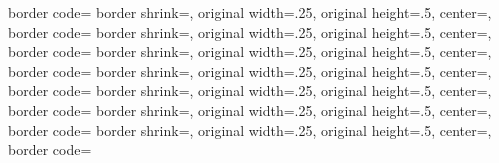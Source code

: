 {{	border code=\pgfsetlinewidth{.5pt}\pgfstroke
  }%
  {%
	border shrink=\pgfpageoptionborder,%
	original width=.25\pgfpageoptionheight,%
	original height=.5\pgfpageoptionwidth,%
	center=\pgfpoint{0pt}{\pgfphysicalheight},%
	border code=\pgfsetlinewidth{.5pt}\pgfstroke
	}%
  {%
	border shrink=\pgfpageoptionborder,%
	original width=.25\pgfpageoptionheight,%
	original height=.5\pgfpageoptionwidth,%
	center=\pgfpoint{.5\pgfphysicalwidth}{.75\pgfphysicalheight},%
	border code=\pgfsetlinewidth{.5pt}\pgfstroke
  }%
  {%
	border shrink=\pgfpageoptionborder,%
	original width=.25\pgfpageoptionheight,%
	original height=.5\pgfpageoptionwidth,%
	center=\pgfpoint{0pt}{.75\pgfphysicalheight},%
	border code=\pgfsetlinewidth{.5pt}\pgfstroke
  }%
  {%
	border shrink=\pgfpageoptionborder,%
	original width=.25\pgfpageoptionheight,%
	original height=.5\pgfpageoptionwidth,%
	center=\pgfpoint{.5\pgfphysicalwidth}{.5\pgfphysicalheight},%
	border code=\pgfsetlinewidth{.5pt}\pgfstroke
  }%
  {%
	border shrink=\pgfpageoptionborder,%
	original width=.25\pgfpageoptionheight,%
	original height=.5\pgfpageoptionwidth,%
	center=\pgfpoint{0pt}{.5\pgfphysicalheight},%
	border code=\pgfsetlinewidth{.5pt}\pgfstroke
  }%
  {%
	border shrink=\pgfpageoptionborder,%
	original width=.25\pgfpageoptionheight,%
	original height=.5\pgfpageoptionwidth,%
	center=\pgfpoint{.5\pgfphysicalwidth}{.25\pgfphysicalheight},%
	border code=\pgfsetlinewidth{.5pt}\pgfstroke
  }%
  {%
	border shrink=\pgfpageoptionborder,%
	original width=.25\pgfpageoptionheight,%
	original height=.5\pgfpageoptionwidth,%
	center=\pgfpoint{0pt}{.25\pgfphysicalheight},%
	border code=\pgfsetlinewidth{.5pt}\pgfstroke
  }%
}%